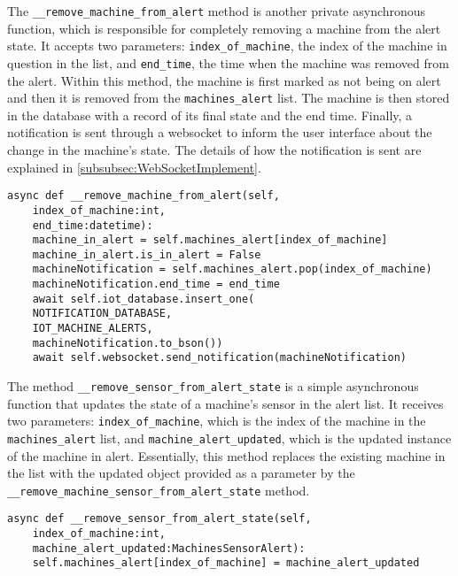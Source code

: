 The \texttt{\_\_remove\_machine\_from\_alert} method is another private asynchronous function, which is responsible for completely removing a machine from the alert state. It accepts two parameters: \texttt{index\_of\_machine}, the index of the machine in question in the list, and \texttt{end\_time}, the time when the machine was removed from the alert. Within this method, the machine is first marked as not being on alert and then it is removed from the \texttt{machines\_alert} list. The machine is then stored in the database with a record of its final state and the end time. Finally, a notification is sent through a websocket to inform the user interface about the change in the machine's state. The details of how the notification is sent are explained in \ref{subsubsec:WebSocketImplement}.

\begin{Verbatim}[fontsize=\small, baselinestretch=0.8]
async def __remove_machine_from_alert(self,
    index_of_machine:int,
    end_time:datetime):
    machine_in_alert = self.machines_alert[index_of_machine]
    machine_in_alert.is_in_alert = False
    machineNotification = self.machines_alert.pop(index_of_machine)
    machineNotification.end_time = end_time
    await self.iot_database.insert_one(
    NOTIFICATION_DATABASE,
    IOT_MACHINE_ALERTS,
    machineNotification.to_bson())
    await self.websocket.send_notification(machineNotification)    
\end{Verbatim}

The method \texttt{\_\_remove\_sensor\_from\_alert\_state} is a simple asynchronous function that updates the state of a machine's sensor in the alert list. It receives two parameters: \texttt{index\_of\_machine}, which is the index of the machine in the \texttt{machines\_alert} list, and \texttt{machine\_alert\_updated}, which is the updated instance of the machine in alert. Essentially, this method replaces the existing machine in the list with the updated object provided as a parameter by the \texttt{\_\_remove\_machine\_sensor\_from\_alert\_state} method.

\begin{Verbatim}[fontsize=\small, baselinestretch=0.8]
async def __remove_sensor_from_alert_state(self,
    index_of_machine:int,
    machine_alert_updated:MachinesSensorAlert):
    self.machines_alert[index_of_machine] = machine_alert_updated
\end{Verbatim}